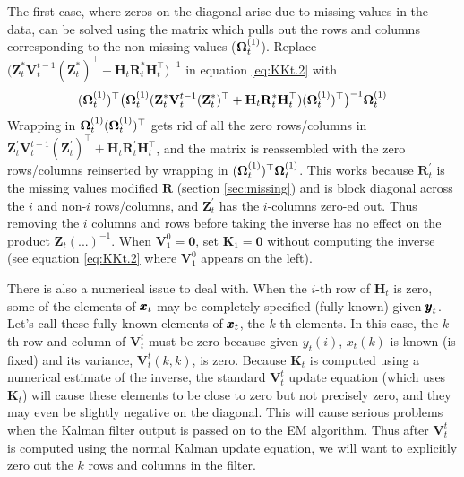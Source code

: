 \documentclass[]{article}
\def\OMG{\mbox{\boldmath $\Omega$}}
\def\XI{\mbox{\boldmath $\Xi$}}
\def\HH{\mbox{$\mathbf H$}}	\def\hh{\mbox{$\mathbf h$}}
\def\KK{\mbox{$\mathbf K$}}
\def\RR{\mbox{$\mathbf R$}}	 \def\rr{\mbox{$\mathbf r$}} \def\Rb{\mbox{$\mathbf H$}}	\def\Rm{\mathbb{R}}
\def\VV{\mbox{$\mathbf V$}}	\def\vv{\mbox{$\mathbf v$}}
\def\ZZ{\mbox{$\mathbf Z$}}	\def\zz{\mbox{$\mathbf z$}}	\def\Zb{\mbox{$\mathbf M$}} \def\Za{\mbox{$\mathbf N$}} \def\Zm{\XI}
\begin{document}
The first case, where zeros on the diagonal arise due to missing values in the data, can be solved using the  matrix which pulls out the rows and columns corresponding to the non-missing values ($\OMG_t^{(1)}$).  Replace $\big(\ZZ_t^*\VV_t^{t-1}(\ZZ_t^*)^\top + \HH_t\RR_t^*\HH_t^\top\big)^{-1}$ in equation \ref{eq:KKt.2} with
\begin{equation}
(\OMG_t^{(1)})^\top\big(\OMG_t^{(1)}(\ZZ_t^*\VV_t^{t-1}(\ZZ_t^*)^\top + \HH_t\RR_t^*\HH_t^\top)(\OMG_t^{(1)})^\top\big)^{-1}\OMG_t^{(1)}
\end{equation}
Wrapping in $\OMG_t^{(1)}(\OMG_t^{(1)})^\top$ gets rid of all the zero rows/columns in $\ZZ_t^\prime\VV_t^{t-1}(\ZZ_t^\prime)^\top + \HH_t\RR_t^\prime\HH_t^\top$, and the matrix is reassembled with the zero rows/columns reinserted by wrapping in $(\OMG_t^{(1)})^\top\OMG_t^{(1)}$.  This works because $\RR_t^\prime$ is the missing values modified $\RR$ (section \ref{sec:missing}) and is block diagonal across the $i$ and non-$i$ rows/columns, and $\ZZ_t^\prime$ has the $i$-columns zero-ed out. Thus removing the $i$ columns and rows before taking the inverse has no effect on the product $\ZZ_t(...)^{-1}$. When $\VV_1^0=\mathbf{0}$, set $\KK_1=\mathbf{0}$ without computing the inverse (see equation \ref{eq:KKt.2} where $\VV_1^0$ appears on the left).

There is also a numerical issue to deal with.  When the $i$-th row of $\HH_t$ is zero, some of the elements of $\mbox{$\pmb{x}$}_t$ may be completely specified (fully known) given $\mbox{$\pmb{y}$}_t$.  Let's call these fully known elements of $\mbox{$\pmb{x}$}_t$, the $k$-th elements.  In this case, the $k$-th row and column of $\VV_t^t$ must be zero because given $y_t(i)$, $x_t(k)$ is known (is fixed) and its variance, $\VV_t^t(k,k)$, is zero.  Because  $\KK_t$ is computed using a numerical estimate of the inverse, the standard $\VV_t^t$ update equation (which uses $\KK_t$) will cause these elements to be close to zero but not precisely zero, and they may even be slightly negative on the diagonal. This will cause serious problems when the Kalman filter output is passed on to the EM algorithm. Thus after $\VV_t^t$ is computed using the normal Kalman update equation, we will want to explicitly zero out the $k$ rows and columns in the filter.  
\end{document}
